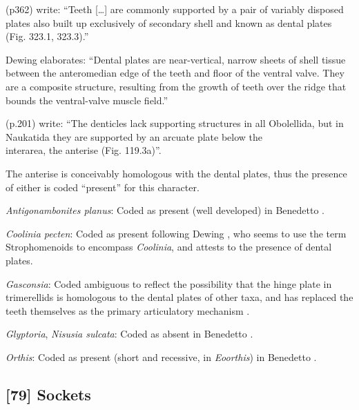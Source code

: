 \documentclass[openany]{book}
\begin{document}
\citet{Williams1997Introduction} (p362) write: ``Teeth {[}\ldots{}{]}
are commonly supported by a pair of variably disposed plates also built
up exclusively of secondary shell and known as dental plates (Fig.
323.1, 323.3).''

Dewing \citeyearpar{Dewing2001Hingemodifications} elaborates: ``Dental
plates are near-vertical, narrow sheets of shell tissue between the
anteromedian edge of the teeth and floor of the ventral valve. They are
a composite structure, resulting from the growth of teeth over the ridge
that bounds the ventral-valve muscle field.''

\citet{Williams2000LinguliformeaCraniiformea} (p.201) write: ``The
denticles lack supporting structures in all Obolellida, but in Naukatida
they are supported by an arcuate plate below the\\
interarea, the anterise (Fig. 119.3a)''.

The anterise is conceivably homologous with the dental plates, thus the
presence of either is coded ``present'' for this character.

\hypertarget{Antigonambonites_planus-coding-78}{}
\emph{Antigonambonites planus}: Coded as present (well developed) in
Benedetto \citeyearpar{Benedetto2009iChaniella}.

\hypertarget{Coolinia_pecten-coding-78}{}
\emph{Coolinia pecten}: Coded as present following Dewing
\citeyearpar{Dewing2001Hingemodifications}, who seems to use the term
Strophomenoids to encompass \emph{Coolinia}, and attests to the presence
of dental plates.

\hypertarget{Gasconsia-coding-78}{}
\emph{Gasconsia}: Coded ambiguous to reflect the possibility that the
hinge plate in trimerellids is homologous to the dental plates of other
taxa, and has replaced the teeth themselves as the primary articulatory
mechanism \citep[see][p.~184, for details of the
articulation]{Williams2000LinguliformeaCraniiformea}.

\hypertarget{Glyptoria-coding-78}{}
\emph{Glyptoria}, \emph{Nisusia sulcata}: Coded as absent in Benedetto
\citeyearpar{Benedetto2009iChaniella}.

\hypertarget{Orthis-coding-78}{}
\emph{Orthis}: Coded as present (short and recessive, in
\emph{Eoorthis}) in Benedetto \citeyearpar{Benedetto2009iChaniella}.

\subsection*{{[}79{]} Sockets}\label{sockets}
\end{document}
